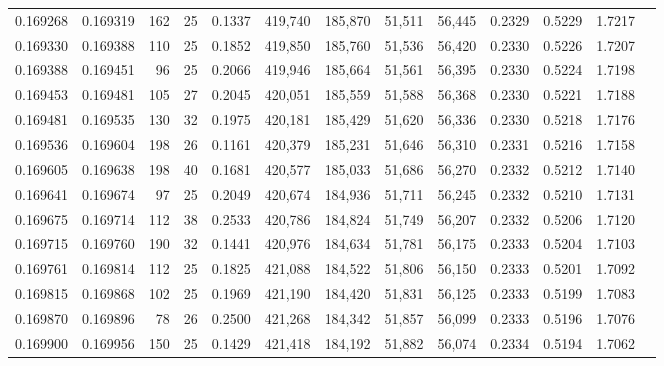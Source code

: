 \begin{tabular}{rrrrrrrrrrrrr}
0.169268 & 0.169319 & 162 &  25 &                                     0.1337 & 419,740 & 185,870 &  51,511 &  56,445 & 0.2329 & 0.5229 & 1.7217 \\
0.169330 & 0.169388 & 110 &  25 &                                     0.1852 & 419,850 & 185,760 &  51,536 &  56,420 & 0.2330 & 0.5226 & 1.7207 \\
0.169388 & 0.169451 &  96 &  25 &                                     0.2066 & 419,946 & 185,664 &  51,561 &  56,395 & 0.2330 & 0.5224 & 1.7198 \\
0.169453 & 0.169481 & 105 &  27 &                                     0.2045 & 420,051 & 185,559 &  51,588 &  56,368 & 0.2330 & 0.5221 & 1.7188 \\
0.169481 & 0.169535 & 130 &  32 &                                     0.1975 & 420,181 & 185,429 &  51,620 &  56,336 & 0.2330 & 0.5218 & 1.7176 \\
0.169536 & 0.169604 & 198 &  26 &                                     0.1161 & 420,379 & 185,231 &  51,646 &  56,310 & 0.2331 & 0.5216 & 1.7158 \\
0.169605 & 0.169638 & 198 &  40 &                                     0.1681 & 420,577 & 185,033 &  51,686 &  56,270 & 0.2332 & 0.5212 & 1.7140 \\
0.169641 & 0.169674 &  97 &  25 &                                     0.2049 & 420,674 & 184,936 &  51,711 &  56,245 & 0.2332 & 0.5210 & 1.7131 \\
0.169675 & 0.169714 & 112 &  38 &                                     0.2533 & 420,786 & 184,824 &  51,749 &  56,207 & 0.2332 & 0.5206 & 1.7120 \\
0.169715 & 0.169760 & 190 &  32 &                                     0.1441 & 420,976 & 184,634 &  51,781 &  56,175 & 0.2333 & 0.5204 & 1.7103 \\
0.169761 & 0.169814 & 112 &  25 &                                     0.1825 & 421,088 & 184,522 &  51,806 &  56,150 & 0.2333 & 0.5201 & 1.7092 \\
0.169815 & 0.169868 & 102 &  25 &                                     0.1969 & 421,190 & 184,420 &  51,831 &  56,125 & 0.2333 & 0.5199 & 1.7083 \\
0.169870 & 0.169896 &  78 &  26 &                                     0.2500 & 421,268 & 184,342 &  51,857 &  56,099 & 0.2333 & 0.5196 & 1.7076 \\
0.169900 & 0.169956 & 150 &  25 &                                     0.1429 & 421,418 & 184,192 &  51,882 &  56,074 & 0.2334 & 0.5194 & 1.7062 \\

\end{tabular}
